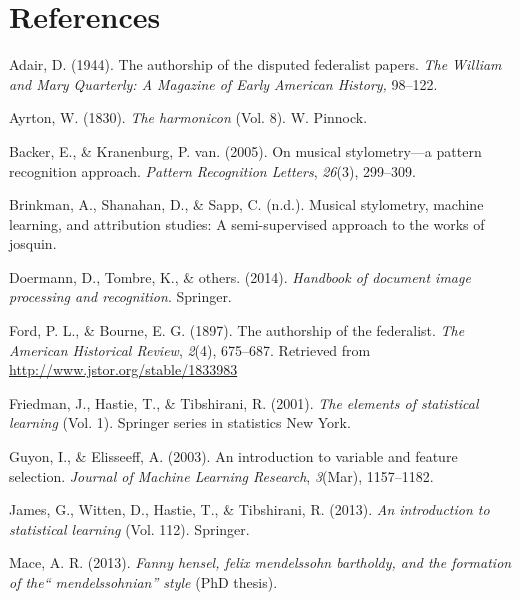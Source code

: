 \documentclass[12pt,twoside]{reedthesis}
\theoremstyle{definition}
\theoremstyle{definition}
\theoremstyle{definition}
\theoremstyle{remark}
\begin{document}
\backmatter

\chapter*{References}\label{references}


\noindent

\setlength{\parindent}{-0.20in} \setlength{\leftskip}{0.20in}
\setlength{\parskip}{8pt}

\hypertarget{refs}{}
\hypertarget{ref-adair1944}{}
Adair, D. (1944). The authorship of the disputed federalist papers.
\emph{The William and Mary Quarterly: A Magazine of Early American
History,} 98--122.

\hypertarget{ref-harmonicon}{}
Ayrton, W. (1830). \emph{The harmonicon} (Vol. 8). W. Pinnock.

\hypertarget{ref-backer2005}{}
Backer, E., \& Kranenburg, P. van. (2005). On musical stylometry---a
pattern recognition approach. \emph{Pattern Recognition Letters},
\emph{26}(3), 299--309.

\hypertarget{ref-brinkman2016}{}
Brinkman, A., Shanahan, D., \& Sapp, C. (n.d.). Musical stylometry,
machine learning, and attribution studies: A semi-supervised approach to
the works of josquin.

\hypertarget{ref-OMR}{}
Doermann, D., Tombre, K., \& others. (2014). \emph{Handbook of document
image processing and recognition}. Springer.

\hypertarget{ref-authorshipfed}{}
Ford, P. L., \& Bourne, E. G. (1897). The authorship of the federalist.
\emph{The American Historical Review}, \emph{2}(4), 675--687. Retrieved
from \url{http://www.jstor.org/stable/1833983}

\hypertarget{ref-esl}{}
Friedman, J., Hastie, T., \& Tibshirani, R. (2001). \emph{The elements
of statistical learning} (Vol. 1). Springer series in statistics New
York.

\hypertarget{ref-guyon2003}{}
Guyon, I., \& Elisseeff, A. (2003). An introduction to variable and
feature selection. \emph{Journal of Machine Learning Research},
\emph{3}(Mar), 1157--1182.

\hypertarget{ref-isl}{}
James, G., Witten, D., Hastie, T., \& Tibshirani, R. (2013). \emph{An
introduction to statistical learning} (Vol. 112). Springer.

\hypertarget{ref-mace2013}{}
Mace, A. R. (2013). \emph{Fanny hensel, felix mendelssohn bartholdy, and
the formation of the`` mendelssohnian'' style} (PhD thesis).
\end{document}

